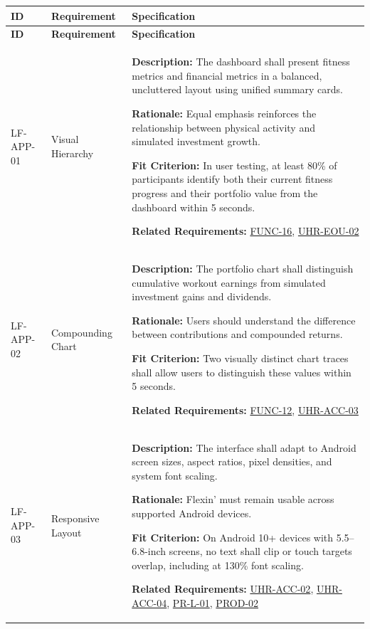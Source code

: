 \documentclass[12pt]{article}
\begin{document}
\small
\setlength{\tabcolsep}{4pt}
\begin{xltabular}{\textwidth}{|p{2.6cm}|p{3.4cm}|X|}
\hline
\textbf{ID} & \textbf{Requirement} & \textbf{Specification} \\
\hline
\endfirsthead
\hline
\textbf{ID} & \textbf{Requirement} & \textbf{Specification} \\
\hline
\endhead

LF-APP-01\hypertarget{req:LF-APP-01}{} &
Visual Hierarchy &
\textbf{Description:} The dashboard shall present fitness metrics and financial metrics in a balanced, uncluttered layout using unified summary cards.

\textbf{Rationale:} Equal emphasis reinforces the relationship between physical activity and simulated investment growth.

\textbf{Fit Criterion:} In user testing, at least 80\% of participants identify both their current fitness progress and their portfolio value from the dashboard within 5 seconds.

\textbf{Related Requirements:} \hyperlink{req:FUNC-16}{FUNC-16}, \hyperlink{req:UHR-EOU-02}{UHR-EOU-02}\\
\hline

LF-APP-02\hypertarget{req:LF-APP-02}{} &
Compounding Chart &
\textbf{Description:} The portfolio chart shall distinguish cumulative workout earnings from simulated investment gains and dividends.

\textbf{Rationale:} Users should understand the difference between contributions and compounded returns.

\textbf{Fit Criterion:} Two visually distinct chart traces shall allow users to distinguish these values within 5 seconds.

\textbf{Related Requirements:} \hyperlink{req:FUNC-12}{FUNC-12}, \hyperlink{req:UHR-ACC-03}{UHR-ACC-03}\\
\hline

LF-APP-03\hypertarget{req:LF-APP-03}{} &
Responsive Layout &
\textbf{Description:} The interface shall adapt to Android screen sizes, aspect ratios, pixel densities, and system font scaling.

\textbf{Rationale:} Flexin' must remain usable across supported Android devices.

\textbf{Fit Criterion:} On Android 10+ devices with 5.5--6.8-inch screens, no text shall clip or touch targets overlap, including at 130\% font scaling.

\textbf{Related Requirements:} \hyperlink{req:UHR-ACC-02}{UHR-ACC-02}, \hyperlink{req:UHR-ACC-04}{UHR-ACC-04}, \hyperlink{req:PR-L-01}{PR-L-01}, \hyperlink{req:PROD-02}{PROD-02}\\
\hline


\end{xltabular}
\end{document}
